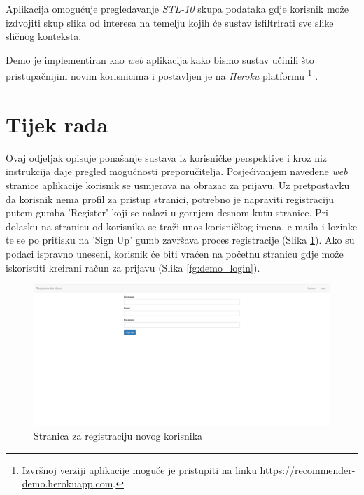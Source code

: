 \documentclass[times, utf8, proizvoljni, numeric]{fer}
\begin{document}
Aplikacija omogućuje pregledavanje \textit{STL-10} skupa podataka gdje korisnik može izdvojiti skup slika od interesa na temelju kojih će sustav isfiltrirati sve slike sličnog konteksta.

Demo je implementiran kao \textit{web} aplikacija kako bismo sustav učinili što pristupačnijim novim korisnicima i postavljen je na \textit{Heroku} platformu \footnote{Izvršnoj verziji aplikacije moguće je pristupiti na linku \url{https://recommender-demo.herokuapp.com}.} .


\section{Tijek rada}

Ovaj odjeljak opisuje ponašanje sustava iz korisničke perspektive i kroz niz instrukcija daje pregled mogućnosti preporučitelja. Posjećivanjem navedene \textit{web} stranice aplikacije korisnik se usmjerava na obrazac za prijavu. Uz pretpostavku da korisnik nema profil za pristup stranici, potrebno je napraviti registraciju putem gumba 'Register' koji se nalazi u gornjem desnom kutu stranice. Pri dolasku na stranicu od korisnika se traži unos korisničkog imena, e-maila i lozinke te se po pritisku na 'Sign Up' gumb završava proces registracije (Slika \ref{fg:demo_register}). Ako su podaci ispravno uneseni, korisnik će biti vraćen na početnu stranicu gdje može iskoristiti kreirani račun za prijavu (Slika \ref{fg:demo_login}). 
 
\begin{figure}[!ht]
	\begin{center}
		\captionsetup{justification=centering}
		\includegraphics[width=1.0\textwidth]{./imgs/demo-preporucitelja-po-sadrzaju/tijek-rada/demo-regi.png}
		\caption{Stranica za registraciju novog korisnika}
		\label{fg:demo_register}
	\end{center}
\end{figure}
\end{document}
